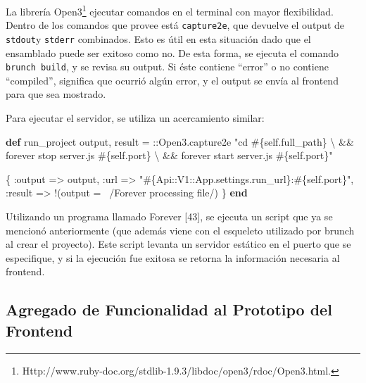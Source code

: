 \documentclass[12pt,spanish,letter]{report}
\newenvironment{Shaded}{}{}
\newcommand{\KeywordTok}[1]{\textcolor[rgb]{0.00,0.44,0.13}{\textbf{{#1}}}}
\newcommand{\DataTypeTok}[1]{\textcolor[rgb]{0.56,0.13,0.00}{{#1}}}
\newcommand{\DecValTok}[1]{\textcolor[rgb]{0.25,0.63,0.44}{{#1}}}
\newcommand{\StringTok}[1]{\textcolor[rgb]{0.25,0.44,0.63}{{#1}}}
\newcommand{\OtherTok}[1]{\textcolor[rgb]{0.00,0.44,0.13}{{#1}}}
\newcommand{\NormalTok}[1]{{#1}}
\begin{document}
La librería Open3\footnote{Http://www.ruby-doc.org/stdlib-1.9.3/libdoc/open3/rdoc/Open3.html.}
ejecutar comandos en el terminal con mayor flexibilidad. Dentro de los
comandos que provee está \texttt{capture2e}, que devuelve el output de
\texttt{stdout}y \texttt{stderr} combinados. Esto es útil en esta
situación dado que el ensamblado puede ser exitoso como no. De esta
forma, se ejecuta el comando \texttt{brunch build}, y se revisa su
output. Si éste contiene ``error'' o no contiene ``compiled'', significa
que ocurrió algún error, y el output se envía al frontend para que sea
mostrado.

Para ejecutar el servidor, se utiliza un acercamiento similar:

\begin{Shaded}
\begin{Highlighting}[]
\KeywordTok{def} \NormalTok{run_project}
  \NormalTok{output, result = ::}\DataTypeTok{Open3}\NormalTok{.capture2e }\StringTok{"cd }\OtherTok{#\{}\DecValTok{self}\NormalTok{.full_path}\OtherTok{\}}\StringTok{ \textbackslash{}}
\StringTok{                   && forever stop server.js }\OtherTok{#\{}\DecValTok{self}\NormalTok{.port}\OtherTok{\}}\StringTok{ \textbackslash{}}
\StringTok{                   && forever start server.js }\OtherTok{#\{}\DecValTok{self}\NormalTok{.port}\OtherTok{\}}\StringTok{"}

  \NormalTok{\{}
    \StringTok{:output} \NormalTok{=> output,}
    \StringTok{:url} \NormalTok{=> }\StringTok{"}\OtherTok{#\{}\DataTypeTok{Api}\NormalTok{::}\DataTypeTok{V1}\NormalTok{::}\DataTypeTok{App}\NormalTok{.settings.run_url}\OtherTok{\}}\StringTok{:}\OtherTok{#\{}\DecValTok{self}\NormalTok{.port}\OtherTok{\}}\StringTok{"}\NormalTok{,}
    \StringTok{:result} \NormalTok{=> !(output =~ }\OtherTok{/Forever processing file/}\NormalTok{)}
  \NormalTok{\}}
\KeywordTok{end}
\end{Highlighting}
\end{Shaded}

Utilizando un programa llamado Forever {[}43{]}, se ejecuta un script
que ya se mencionó anteriormente (que además viene con el esqueleto
utilizado por brunch al crear el proyecto). Este script levanta un
servidor estático en el puerto que se especifique, y si la ejecución fue
exitosa se retorna la información necesaria al frontend.

\subsection{Agregado de Funcionalidad al Prototipo del Frontend}
\end{document}
